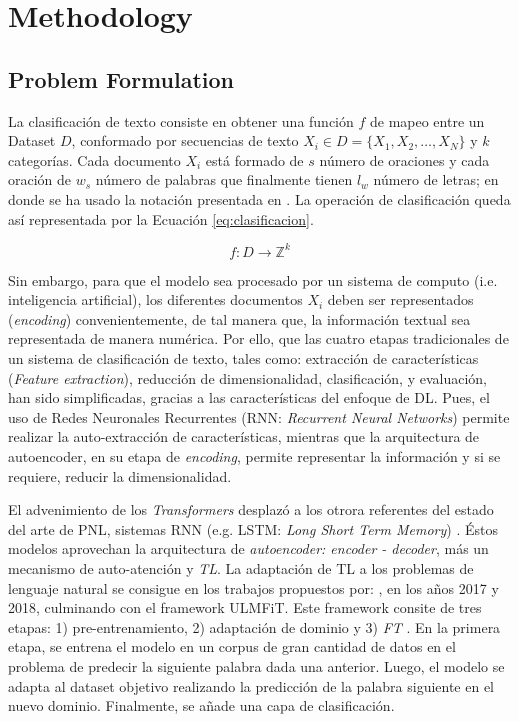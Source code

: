 \documentclass[onecolumn, journal, english, 12pt, a4paper]{IEEEtran} %
\theoremstyle{definition}
\begin{document}
\section{Methodology}\label{chap:metodos}
\subsection{Problem Formulation}

La clasificación de texto consiste en obtener una función $f$ de mapeo
entre un Dataset $D$, conformado por secuencias de texto
$X_i \in D=\{X_1, X_2, \dots, X_N\}$ y $k$ categorías.  Cada documento
$X_i$ está formado de $s$ número de oraciones y cada oración de $w_s$
número de palabras que finalmente tienen $l_w$ número de letras; en
donde se ha usado la notación presentada en \cite{Kowsari2019}. La
operación de clasificación queda así representada por la Ecuación
\ref{eq:clasificacion}.

\begin{equation}\label{eq:clasificacion}
    f: D \longrightarrow \mathbb{Z}^k
\end{equation}

Sin embargo, para que el modelo sea procesado por un sistema de computo (i.e. inteligencia artificial), los diferentes documentos $X_i$ deben ser representados (\emph{encoding}) convenientemente, de tal manera que, la información textual sea representada de manera numérica. Por ello, que las cuatro etapas tradicionales de un sistema de clasificación de texto, tales como: extracción de características (\emph{Feature extraction}), reducción de dimensionalidad, clasificación, y evaluación, han sido simplificadas, gracias a las características del enfoque de DL. Pues, el uso de Redes Neuronales Recurrentes (RNN: \emph{Recurrent Neural Networks}) permite realizar la auto-extracción de características, mientras que la arquitectura de autoencoder, en su etapa de \emph{encoding}, permite representar la información y si se requiere, reducir la dimensionalidad.

El advenimiento de los \emph{Transformers} desplazó a los otrora referentes del estado del arte de PNL, sistemas RNN (e.g. LSTM: \emph{Long Short Term Memory}) \cite{tunstall2022natural}. Éstos modelos aprovechan la arquitectura de \emph{autoencoder: encoder - decoder}, más un mecanismo de auto-atención y \emph{TL}. La adaptación de TL a los problemas de lenguaje natural se consigue en los trabajos propuestos por: \cite{radford2019language}, \cite{Peters2018} en los años 2017 y 2018, culminando con el framework ULMFiT\cite{howard2018}. Este framework consite de tres etapas: 1) pre-entrenamiento, 2) adaptación de dominio y 3) \emph{FT} \cite{tunstall2022natural}. En la primera etapa, se entrena el modelo en un corpus de gran cantidad de datos en el problema de predecir la siguiente palabra dada una anterior. Luego, el modelo se adapta al dataset objetivo realizando la predicción de la palabra siguiente en el nuevo dominio. Finalmente, se añade una capa de clasificación\cite{tunstall2022natural}. 
\end{document}
